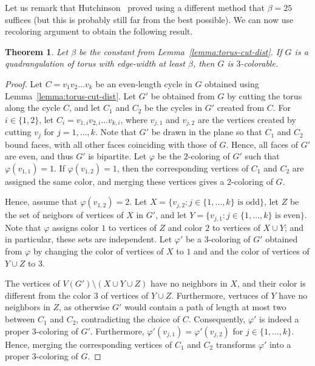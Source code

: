 \documentclass[12pt,twoside,openright,a4paper]{book}
\newtheorem{theorem}{Theorem}[chapter]
\begin{document}
Let us remark that Hutchinson~\cite{locplanq} proved using a different method that $\beta=25$ suffices
(but this is probably still far from the best possible).
We can now use recoloring argument to obtain the following result.

\begin{theorem}\label{thm:torquadr}
Let $\beta$ be the constant from Lemma~\ref{lemma:torus-cut-dist}.
If $G$ is a quadrangulation of torus with edge-width at least $\beta$, then $G$ is $3$-colorable.
\end{theorem}
\begin{proof}
Let $C=v_1v_2\ldots v_k$ be an even-length cycle in $G$ obtained using Lemma~\ref{lemma:torus-cut-dist}.
Let $G'$ be obtained from $G$ by cutting the torus along the cycle $C$, and let $C_1$ and $C_2$ be the cycles
in $G'$ created from $C$.  For $i\in\{1,2\}$, let $C_i=v_{1,i}v_{2,i}\ldots v_{k,i}$, where $v_{j,1}$ and $v_{j,2}$ are the
vertices created by cutting $v_j$ for $j=1,\ldots,k$.  Note that $G'$ be drawn in the plane so that $C_1$ and $C_2$ bound faces, with
all other faces coinciding with those of $G$.  Hence, all faces of $G'$ are even, and thus $G'$ is bipartite.
Let $\varphi$ be the $2$-coloring of $G'$ such that $\varphi(v_{1,1})=1$.  If $\varphi(v_{1,2})=1$, then the corresponding vertices
of $C_1$ and $C_2$ are assigned the same color, and merging these vertices gives a $2$-coloring of $G$.

Hence, assume that $\varphi(v_{1,2})=2$.
Let $X=\{v_{j,2}:\text{$j\in\{1,\ldots, k\}$ is odd}\}$, let $Z$ be the set of neigbors of vertices of $X$ in $G'$, and
let $Y=\{v_{j,1}:\text{$j\in\{1,\ldots, k\}$ is even}\}$.
Note that $\varphi$ assigns color $1$ to vertices of $Z$ and color $2$ to vertices of $X\cup Y$; and in particular, these
sets are independent.
Let $\varphi'$ be a $3$-coloring of $G'$ obtained from $\varphi$ by changing the color of vertices of $X$ to $1$ and
and the color of vertices of $Y\cup Z$ to $3$.  

The vertices of $V(G')\setminus (X\cup Y\cup Z)$ have no neighbors in $X$, and their color is different from the color $3$ of vertices of $Y\cup Z$.
Furthermore, vertuces of $Y$ have no neighbors in $Z$, as otherwise $G'$ would contain a path of length at most two between $C_1$ and $C_2$,
contradicting the choice of $C$.  Consequently, $\varphi'$ is indeed a proper $3$-coloring of $G'$.
Furthermore, $\varphi'(v_{j,1})=\varphi'(v_{j,2})$ for $j\in\{1,\ldots, k\}$.  Hence, merging the corresponding vertices of $C_1$ and $C_2$
transforms $\varphi'$ into a proper $3$-coloring of $G$.
\end{proof}
\end{document}
